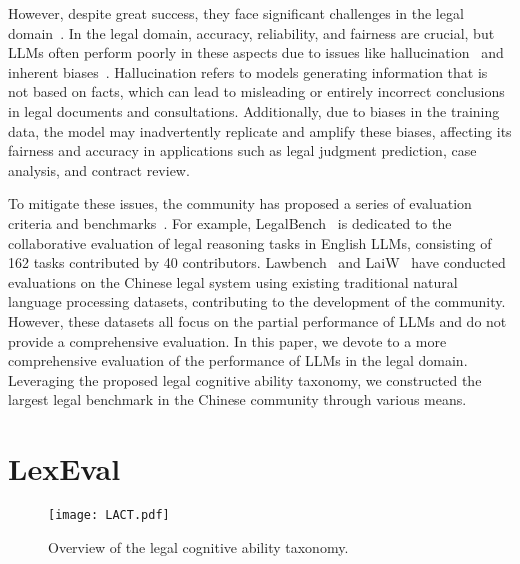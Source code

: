However, despite great success, they face significant challenges in the legal domain~\cite{li2023dark,cheong2024not,deroy2023ready,li2023thuircoliee2023incorporatingstructural}.
In the legal domain, accuracy, reliability, and fairness are crucial, but LLMs often perform poorly in these aspects due to issues like hallucination~\cite{li2023dark} and inherent biases~\cite{zhang2024evaluationethicsllmslegal,chu2024prepeerreviewbased,li2024calibraevalcalibratingpredictiondistribution}.
Hallucination refers to models generating information that is not based on facts, which can lead to misleading or entirely incorrect conclusions in legal documents and consultations. Additionally, due to biases in the training data, the model may inadvertently replicate and amplify these biases, affecting its fairness and accuracy in applications such as legal judgment prediction, case analysis, and contract review.

To mitigate these issues, the community has proposed a series of evaluation criteria and benchmarks~\cite{guha2023legalbench,fei2023lawbench,dai2023laiw,lecardv2}. For example, LegalBench~\cite{guha2023legalbench} is dedicated to the collaborative evaluation of legal reasoning tasks in English LLMs, consisting of 162 tasks contributed by 40 contributors.
Lawbench~\cite{fei2023lawbench} and LaiW~\cite{dai2023laiw} have conducted evaluations on the Chinese legal system using existing traditional natural language processing datasets, contributing to the development of the community. However, these datasets all focus on the partial performance of LLMs and do not provide a comprehensive evaluation.
In this paper, we devote to a more comprehensive evaluation of the performance of LLMs in the legal domain. Leveraging the proposed legal cognitive ability taxonomy, we constructed the largest legal benchmark in the Chinese community through various means.

\section{LexEval}

\begin{figure}[t]
\vspace{-3mm}
\centering
\texttt{[image: LACT.pdf]}
\vspace{-3mm}
\caption{Overview of the legal cognitive ability taxonomy. }
\label{taxonomy}
\vspace{-3mm}
\end{figure}

